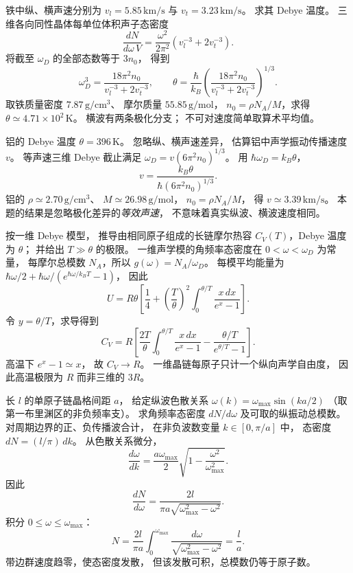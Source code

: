 铁中纵、横声速分别为
$v_l=5.85\,\mathrm{km/s}$ 与
$v_t=3.23\,\mathrm{km/s}$。
求其 Debye 温度。
\exsolution
三维各向同性晶体每单位体积声子态密度
\[
 \frac{dN}{d\omega\,V}=
 \frac{\omega^2}{2\pi^2}
 \left(v_l^{-3}+2v_t^{-3}\right).
\]
将截至 $\omega_D$ 的全部态数等于 $3n_0$，
得到
\[
 \omega_D^3=\frac{18\pi^2n_0}
 {v_l^{-3}+2v_t^{-3}},\qquad
 \boxed{\theta=\frac{\hbar}{k_B}
 \left(\frac{18\pi^2n_0}
 {v_l^{-3}+2v_t^{-3}}\right)^{1/3}}.
\]
取铁质量密度 $7.87\,\mathrm{g/cm^3}$、
摩尔质量 $55.85\,\mathrm{g/mol}$，
$n_0=\rho N_A/M$，求得
$\boxed{\theta\simeq4.71\times10^2\,\mathrm K}$。
\excheck 横波有两条极化分支；
不可对速度简单取算术平均值。

铝的 Debye 温度 $\theta=396\,\mathrm K$。
忽略纵、横声速差异，
估算铝中声学振动传播速度 $v$。
\exsolution
等声速三维 Debye 截止满足
$\omega_D=v(6\pi^2n_0)^{1/3}$。
用 $\hbar\omega_D=k_B\theta$，
\[
 \boxed{v=\frac{k_B\theta}
 {\hbar(6\pi^2n_0)^{1/3}}}.
\]
铝的 $\rho\simeq2.70\,\mathrm{g/cm^3}$、
$M\simeq26.98\,\mathrm{g/mol}$，
$n_0=\rho N_A/M$，
得 $\boxed{v\simeq3.39\,\mathrm{km/s}}$。
\excheck 本题的结果是忽略极化差异的\emph{等效声速}，
不意味着真实纵波、横波速度相同。

按一维 Debye 模型，
推导由相同原子组成的长链摩尔热容
$C_V(T)$，Debye 温度为 $\theta$；
并给出 $T\gg\theta$ 的极限。
\exsolution
一维声学模的角频率态密度在
$0<\omega<\omega_D$ 为常量，
每摩尔总模数 $N_A$，所以
$g(\omega)=N_A/\omega_D$。
每模平均能量为
$\hbar\omega/2+\hbar\omega/(e^{\hbar\omega/k_BT}-1)$，
因此
\[
 U=R\theta\left[\frac14+
 \left(\frac{T}{\theta}\right)^2
 \int_0^{\theta/T}\frac{x\,dx}{e^x-1}\right].
\]
令 $y=\theta/T$，求导得到
\[
 \boxed{C_V=R\left[
 \frac{2T}{\theta}\int_0^{\theta/T}
 \frac{x\,dx}{e^x-1}
 -\frac{\theta/T}{e^{\theta/T}-1}\right]}.
\]
高温下 $e^x-1\simeq x$，
故 $\boxed{C_V\longrightarrow R}$。
\excheck 一维晶链每原子只计一个纵向声学自由度，
因此高温极限为 $R$ 而非三维的 $3R$。

长 $l$ 的单原子链晶格间距 $a$，
给定纵波色散关系
$\omega(k)=\omega_{\max}\sin(ka/2)$
（取第一布里渊区的非负频率支）。
求角频率态密度 $dN/d\omega$
及可取的纵振动总模数。
\exsolution
对周期边界的正、负传播波合计，
在非负波数变量 $k\in[0,\pi/a]$ 中，
态密度 $dN=(l/\pi)\,dk$。
从色散关系微分，
\[
 \frac{d\omega}{dk}=
 \frac{a\omega_{\max}}2
 \sqrt{1-\frac{\omega^2}{\omega_{\max}^2}}.
\]
因此
\[
 \boxed{\frac{dN}{d\omega}=
 \frac{2l}{\pi a\sqrt{\omega_{\max}^2-\omega^2}}}.
\]
积分 $0\le\omega\le\omega_{\max}$：
\[
 N=\frac{2l}{\pi a}
 \int_0^{\omega_{\max}}
 \frac{d\omega}{\sqrt{\omega_{\max}^2-\omega^2}}
 =\boxed{\frac la}.
\]
\excheck 带边群速度趋零，使态密度发散，
但该发散可积，总模数仍等于原子数。

